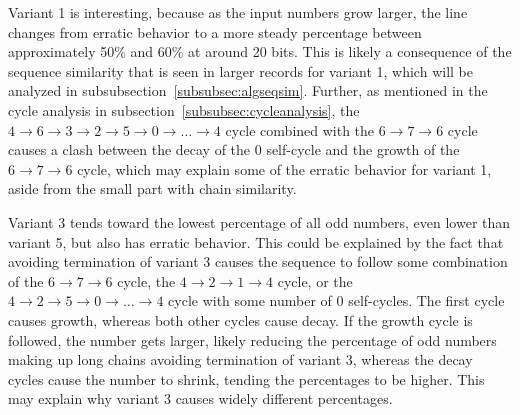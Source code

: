 Variant 1 is interesting, because as the input numbers grow larger, the line changes from erratic behavior to a more steady percentage between approximately 50\% and 60\% at around 20 bits. This is likely a consequence of the sequence similarity that is seen in larger records for variant 1, which will be analyzed in subsubsection~\ref{subsubsec:algseqsim}. Further, as mentioned in the cycle analysis in subsection~\ref{subsubsec:cycleanalysis}, the $4 \rightarrow 6 \rightarrow 3 \rightarrow 2 \rightarrow 5 \rightarrow 0 \rightarrow \ldots \rightarrow 4$ cycle combined with the  $6 \rightarrow 7 \rightarrow 6$ cycle causes a clash between the decay of the 0 self-cycle and the growth of the $6 \rightarrow 7 \rightarrow 6$ cycle, which may explain some of the erratic behavior for variant 1, aside from the small part with chain similarity. \par
Variant 3 tends toward the lowest percentage of all odd numbers, even lower than variant 5, but also has erratic behavior. This could be explained by the fact that avoiding termination of variant 3 causes the sequence to follow some combination of the $6 \rightarrow 7 \rightarrow 6$ cycle, the $4 \rightarrow 2 \rightarrow 1 \rightarrow 4$ cycle, or the $4 \rightarrow 2 \rightarrow 5 \rightarrow 0  \rightarrow \ldots \rightarrow 4$ cycle with some number of $0$ self-cycles. The first cycle causes growth, whereas both other cycles cause decay. If the growth cycle is followed, the number gets larger, likely reducing the percentage of odd numbers making up long chains avoiding termination of variant 3, whereas the decay cycles cause the number to shrink, tending the percentages to be higher. This may explain why variant 3 causes widely different percentages.

